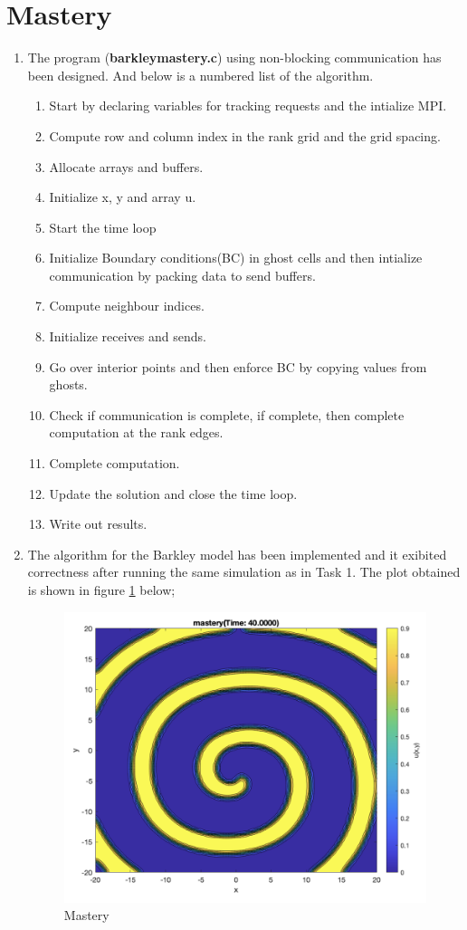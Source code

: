 \documentclass[12pt,a4paper]{article}
\begin{document}
	\newpage
	\section*{Mastery}	
	\begin{enumerate}
		\item The program (\textbf{barkley\textunderscore mastery.c}) using non-blocking communication has been designed.  And below is a numbered list of the algorithm.
		\begin{enumerate}
			\item  Start by declaring variables for tracking requests and the intialize MPI.
			\item Compute row and column index in the rank grid and the grid spacing.
			\item Allocate arrays and buffers.
			\item Initialize x, y and array u.
			\item Start the time loop 
			\item Initialize Boundary conditions(BC) in ghost cells and then intialize communication by packing data to send buffers.
			\item Compute neighbour indices. 
			\item Initialize receives and sends.
			\item Go over interior points and then enforce  BC by copying values from ghosts.
			\item Check if communication is complete, if complete, then complete computation at the rank edges.
			\item Complete computation.
			\item Update the solution and close the time loop.
			\item Write out results.
		\end{enumerate}
		
		
		\item The algorithm for the Barkley model has been implemented and it exibited correctness after running the same simulation as in Task 1. The plot obtained is shown in figure \ref{fig:Mastery} below;
		
		\begin{figure}[H]
			\centering
			\includegraphics[width=0.5\linewidth]{"Screenshot 2021-03-16 at 7.01.27 PM"}
			\caption{Mastery}
			\label{fig:Mastery}
		\end{figure}
		

\end{enumerate}
\end{document}
